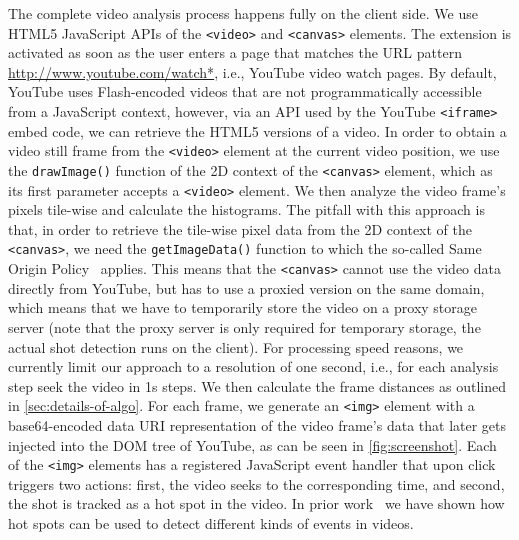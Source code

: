 \documentclass{acm_proc_article-sp}
\newcommand{\inlinelistingsize}{\fontsize{8pt}{11pt}}
\let\oldurl\url
\renewcommand{\url}[1]{\inlinelistingsize\oldurl{#1}}
\begin{document}
The complete video analysis process happens fully on the client side. We use HTML5 JavaScript APIs of the \texttt{<video>} and \texttt{<canvas>} elements. The extension is activated as soon as the user enters a page that matches the URL pattern \url{http://www.youtube.com/watch*}, i.e., YouTube video watch pages. By default, YouTube uses Flash-encoded videos that are not programmatically accessible from a JavaScript context, however, via an API used by the YouTube \texttt{<iframe>} embed code, we can retrieve the HTML5 versions of a video. In order to obtain a video still frame from the \texttt{<video>} element at the current video position, we use the \texttt{drawImage()} function of the 2D context of the \texttt{<canvas>} element, which as its first parameter accepts a \texttt{<video>} element. We then analyze the video frame's pixels tile-wise and calculate the histograms. The pitfall with this approach is that, in order to retrieve the tile-wise pixel data from the 2D context of the \texttt{<canvas>}, we need the \texttt{getImageData()} function to which the so-called Same Origin Policy~\cite{sameoriginpolicy} applies. This means that the \texttt{<canvas>} cannot use the video data directly  from YouTube, but has to use a proxied version on the same domain, which means that we have to temporarily store the video on a proxy storage server (note that the proxy server is only required for temporary storage, the actual shot detection runs on the client). For processing speed reasons, we currently limit our approach to a resolution of one second, i.e., for each analysis step seek the video in 1s steps. We then calculate the frame distances as outlined in \autoref{sec:details-of-algo}. For each frame, we generate an \texttt{<img>} element with a base64-encoded data URI representation of the video frame's data that later gets injected into the DOM tree of YouTube, as can be seen in \autoref{fig:screenshot}. Each of the \texttt{<img>} elements has a registered JavaScript event handler that upon click triggers two actions: first, the video seeks to the corresponding time, and second, the shot is tracked as a hot spot in the video.
In prior work~\cite{derive2011} we have shown how hot spots can be used to detect different kinds of events in videos.

\end{document}
